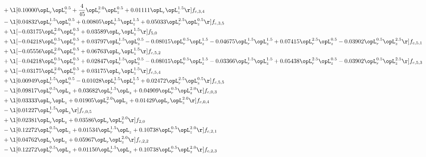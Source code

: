 \begin{alignat}{2}
& + \l[  0.10000 \opL_r \opL_z^{0.5} + \frac{4}{45} \opL_r^{2.0} \opL_z^{0.5} +  0.01111 \opL_r \opL_z^{1.5}  \r] f_{c,3,4} \nonumber \\ 
& - \l[  0.04832 \opL_r^{1.5} \opL_z^{0.5} +  0.00805 \opL_r^{1.5} \opL_z^{1.5} +  0.05033 \opL_r^{2.5} \opL_z^{0.5}  \r] f_{c,3,5} \nonumber \\ 
& + \l[  -0.03175 \opL_r^{2.0} \opL_z^{0.5} +  0.03589 \opL_r \opL_z^{1.5}  \r] f_{5,0} \nonumber \\ 
& + \l[  -0.04218 \opL_r^{0.5} \opL_z^{0.5} +  0.03797 \opL_r^{1.5} \opL_z^{0.5}   -0.08015 \opL_r^{0.5} \opL_z^{1.5}   -0.04675 \opL_r^{1.5} \opL_z^{1.5} +  0.07415 \opL_r^{2.5} \opL_z^{0.5}   -0.03902 \opL_r^{0.5} \opL_z^{2.5}  \r] f_{c,5,1} \nonumber \\ 
& + \l[  -0.05556 \opL_r^{2.0} \opL_z^{0.5} +  0.06763 \opL_r \opL_z^{1.5}  \r] f_{c,5,2} \nonumber \\ 
& + \l[  -0.04218 \opL_r^{0.5} \opL_z^{0.5} +  0.02847 \opL_r^{1.5} \opL_z^{0.5}   -0.08015 \opL_r^{0.5} \opL_z^{1.5}   -0.03366 \opL_r^{1.5} \opL_z^{1.5} +  0.05438 \opL_r^{2.5} \opL_z^{0.5}   -0.03902 \opL_r^{0.5} \opL_z^{2.5}  \r] f_{c,5,3} \nonumber \\ 
& + \l[  -0.03175 \opL_r^{2.0} \opL_z^{0.5} +  0.03175 \opL_r \opL_z^{1.5}  \r] f_{c,5,4} \nonumber \\ 
& + \l[  0.00949 \opL_r^{1.5} \opL_z^{0.5}   -0.01028 \opL_r^{1.5} \opL_z^{1.5} +  0.02472 \opL_r^{2.5} \opL_z^{0.5}  \r] f_{c,5,5} \nonumber \\ 
& - \l[  0.09817 \opL_r^{0.5} \opL_z +  0.03682 \opL_r^{1.5} \opL_z +  0.04909 \opL_r^{0.5} \opL_z^{2.0}  \r] f_{c,0,3} \nonumber \\ 
& + \l[  0.03333 \opL_r \opL_z +  0.01905 \opL_r^{2.0} \opL_z +  0.01429 \opL_r \opL_z^{2.0}  \r] f_{c,0,4} \nonumber \\ 
& - \l[  0.01227 \opL_r^{1.5} \opL_z  \r] f_{c,0,5} \nonumber \\ 
& + \l[  0.02381 \opL_r \opL_z +  0.03586 \opL_r \opL_z^{2.0}  \r] f_{2,0} \nonumber \\ 
& - \l[  0.12272 \opL_r^{0.5} \opL_z +  0.01534 \opL_r^{1.5} \opL_z +  0.10738 \opL_r^{0.5} \opL_z^{2.0}  \r] f_{c,2,1} \nonumber \\ 
& + \l[  0.04762 \opL_r \opL_z +  0.05967 \opL_r \opL_z^{2.0}  \r] f_{c,2,2} \nonumber \\ 
& - \l[  0.12272 \opL_r^{0.5} \opL_z +  0.01150 \opL_r^{1.5} \opL_z +  0.10738 \opL_r^{0.5} \opL_z^{2.0}  \r] f_{c,2,3} \nonumber \\ 

\end{alignat}
